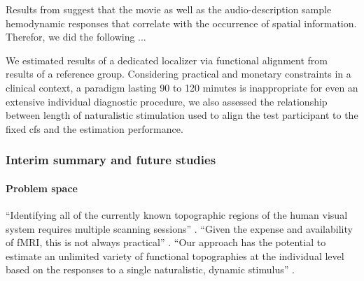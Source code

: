 




%
Results from \citet{haeusler2022processing} suggest that the movie as well as
the audio-description sample hemodynamic responses that correlate with the
occurrence of spatial information.
%
Therefor, we did the following ...

We estimated results of a dedicated localizer \citep{sengupta2016extension} via
functional alignment from results of a reference group.
Considering practical and monetary constraints in a clinical context, a paradigm
lasting 90 to 120 minutes is inappropriate for even an extensive individual
diagnostic procedure, we also assessed the relationship between length of
naturalistic stimulation used to align the test participant to the fixed
\ac{cfs} and the estimation performance.



\subsubsection{Interim summary and future studies}






\paragraph{Problem space}

%
``Identifying all of the currently known topographic regions of the human visual
system requires multiple scanning sessions'' \citep{wang2015probabilistic}.
%
``Given the expense and availability of fMRI, this is not always practical''
\citep{wang2015probabilistic}.
%
``Our approach has the potential to estimate an unlimited variety of functional
topographies at the individual level based on the responses to a single
naturalistic, dynamic stimulus'' \citep{jiahui2020predicting}.


